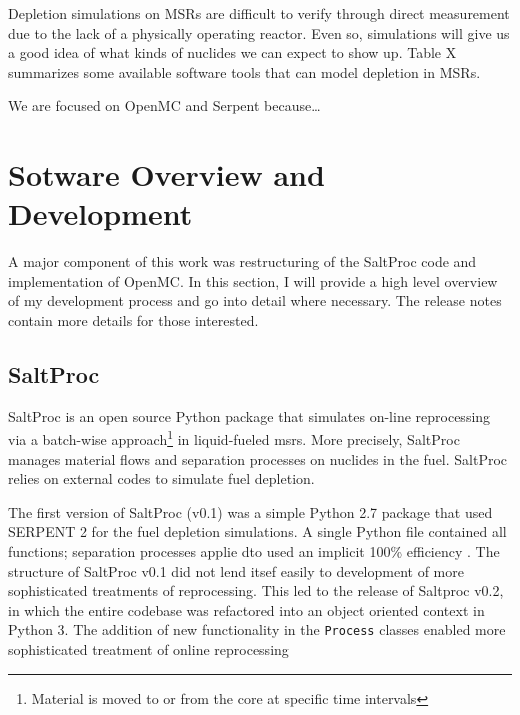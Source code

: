 Depletion simulations on \Gls{MSR}s are difficult to verify through direct measurement due to the lack of a physically operating reactor. Even so, simulations will give us a good idea of what kinds of nuclides we can expect to show up. Table X summarizes some available software tools that can model depletion in \Gls{MSR}s.




We are focused on OpenMC and Serpent because\ldots


\section{Sotware Overview and Development}
\label{sec:soft_dev}
A major component of this work was restructuring of the SaltProc code and implementation of OpenMC. In this section, I will provide a high level overview of my development process and go into detail where necessary. The release notes contain more details for those interested.
\subsection{SaltProc}%
\label{sub:saltproc}

SaltProc\cite{rykhlevskii_saltproc_2018} is an open source Python package that simulates on-line reprocessing via a batch-wise approach\footnote{Material is moved to or from the core at specific time intervals} in liquid-fueled \Gls{msr}s. More precisely, SaltProc manages material flows and separation processes on nuclides in the fuel. SaltProc relies on external codes to simulate fuel depletion.

The first version of SaltProc (v0.1) was a simple Python 2.7 package that used SERPENT 2 for the fuel depletion simulations. A single Python file contained all functions; separation processes applie dto  used an implicit 100\% efficiency \cite{rykhlevskii_advanced_2018}. The structure of SaltProc v0.1 did not lend itsef easily to development of more sophisticated treatments of reprocessing. This led to the release of Saltproc v0.2, in which the entire codebase was refactored into an object oriented
context in Python 3. The addition of new functionality in the \verb.Process. classes enabled more sophisticated treatment of online reprocessing \cite{rykhlevskii_fuel_2020} 

